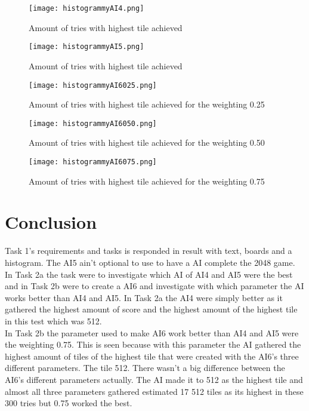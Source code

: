 \documentclass[a4paper,12pt]{article}
\begin{document}
\begin{figure}[H]
  \texttt{[image: histogrammyAI4.png]}
  \caption{Amount of tries with highest tile achieved}
  \label{fig:historgram}
\end{figure}

\begin{figure}[H]
  \texttt{[image: histogrammyAI5.png]}
  \caption{Amount of tries with highest tile achieved}
  \label{fig:historgram}
\end{figure}

\begin{figure}[H]
  \texttt{[image: histogrammyAI6025.png]}
  \caption{Amount of tries with highest tile achieved for the weighting 0.25}
  \label{fig:historgram}
\end{figure}

\begin{figure}[H]
  \texttt{[image: histogrammyAI6050.png]}
  \caption{Amount of tries with highest tile achieved for the weighting 0.50}
  \label{fig:historgram}
\end{figure}

\begin{figure}[H]
  \texttt{[image: histogrammyAI6075.png]}
  \caption{Amount of tries with highest tile achieved for the weighting 0.75}
  \label{fig:historgram}
\end{figure}




\section{Conclusion}
Task 1's requirements and tasks is responded in result with text, boards and a histogram. The AI5 ain't optional to use to have a AI complete the 2048 game.
\\

In Task 2a the task were to investigate which AI of AI4 and AI5 were the best and in Task 2b were to create a AI6 and investigate with which parameter the AI works better than AI4 and AI5. In Task 2a the AI4 were simply better as it gathered the highest amount of score and the highest amount of the highest tile in this test which was 512.
\\

In Task 2b the parameter used to make AI6 work better than AI4 and AI5 were the weighting  0.75. This is seen because with this parameter the AI gathered the highest amount of tiles of the highest tile that were created with the AI6's three different parameters. The tile 512. There wasn't a big difference between the AI6's different parameters actually. The AI made it to 512 as the highest tile and almost all three parameters gathered estimated 17 512 tiles as its highest in these 300 tries but 0.75 worked the best.
\end{document}
